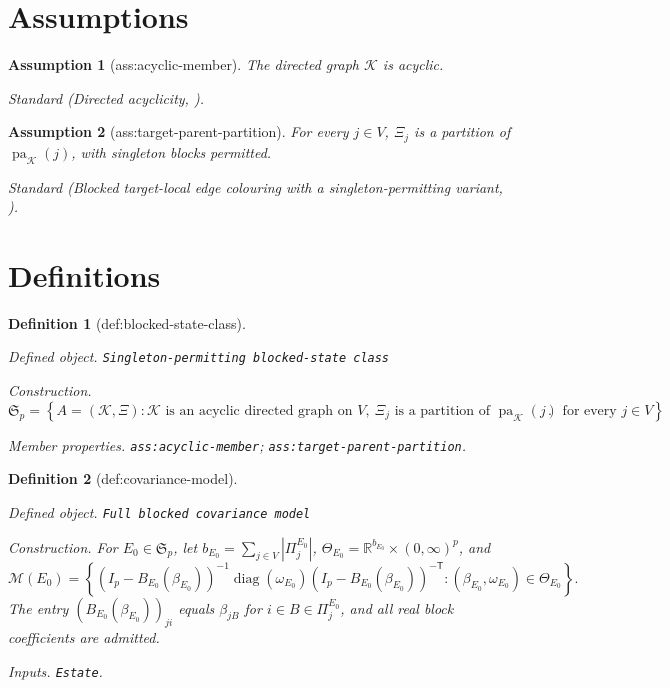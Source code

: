 \documentclass{article}
\newtheorem{assumption}{Assumption}
\newtheorem{definition}{Definition}
\begin{document}
\section{Assumptions}

\begin{assumption}[ass:acyclic-member]\label{ass:acyclic-member}
The directed graph \(\mathcal K\) is acyclic.
\par\smallskip\noindent\emph{Standard} (Directed acyclicity, \cite{Chickering1995}).
\end{assumption}

\begin{assumption}[ass:target-parent-partition]\label{ass:target-parent-partition}
For every \(j\in V\), \(\Xi_j\) is a partition of \(\operatorname{pa}_{\mathcal K}(j)\), with singleton blocks permitted.
\par\smallskip\noindent\emph{Standard} (Blocked target-local edge colouring with a singleton-permitting variant, \cite{BoegeKubjasMisraSolus2026}).
\end{assumption}

\section{Definitions}

\begin{definition}[def:blocked-state-class]\label{def:blocked-state-class}
\par\smallskip\noindent\emph{Defined object.} \texttt{Singleton-\allowbreak{}permitting blocked-\allowbreak{}state class}
\par\smallskip\noindent\emph{Construction.} \[\mathfrak S_p=\left\{A=(\mathcal K,\Xi):\mathcal K\text{ is an acyclic directed graph on }V,\ \Xi_j\text{ is a partition of }\operatorname{pa}_{\mathcal K}(j)\text{ for every }j\in V\right\}.\]
\par\smallskip\noindent\emph{Member properties.} \texttt{ass:\allowbreak{}acyclic-\allowbreak{}member}; \texttt{ass:\allowbreak{}target-\allowbreak{}parent-\allowbreak{}partition}.
\end{definition}

\begin{definition}[def:covariance-model]\label{def:covariance-model}
\par\smallskip\noindent\emph{Defined object.} \texttt{Full blocked covariance model}
\par\smallskip\noindent\emph{Construction.} For \(E_0\in\mathfrak S_p\), let \(b_{E_0}=\sum_{j\in V}|\Pi^{E_0}_j|\), \(\Theta_{E_0}=\mathbb R^{b_{E_0}}\times(0,\infty)^p\), and \[\mathcal M(E_0)=\left\{(I_p-B_{E_0}(\beta_{E_0}))^{-1}\operatorname{diag}(\omega_{E_0})(I_p-B_{E_0}(\beta_{E_0}))^{-\mathsf T}:(\beta_{E_0},\omega_{E_0})\in\Theta_{E_0}\right\}.\] The entry \((B_{E_0}(\beta_{E_0}))_{ji}\) equals \(\beta_{jB}\) for \(i\in B\in\Pi^{E_0}_j\), and all real block coefficients are admitted.
\par\smallskip\noindent\emph{Inputs.} \texttt{Estate}.
\end{definition}
\end{document}
